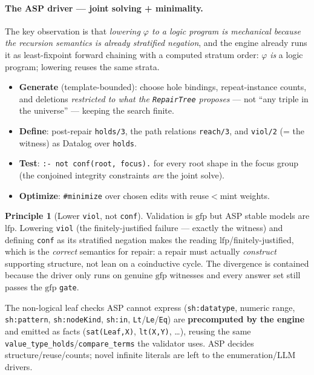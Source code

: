 \documentclass[11pt]{article}
\newcommand{\lfp}{\mathrm{lfp}}
\newcommand{\gfp}{\mathrm{gfp}}
\newcommand{\code}[1]{\texttt{#1}}
\theoremstyle{definition}
\newtheorem{principle}{Principle}[section]
\begin{document}
\paragraph{The ASP driver --- joint solving + minimality.} The key observation is
that \emph{lowering $\varphi$ to a logic program is mechanical because the
recursion semantics is already stratified negation}, and the engine already runs
it as least-fixpoint forward chaining with a computed stratum order: $\varphi$
\emph{is} a logic program; lowering reuses the same strata.
\begin{itemize}[leftmargin=1.4em]
  \item \textbf{Generate} (template-bounded): choose hole bindings, repeat-instance
  counts, and deletions \emph{restricted to what the \code{RepairTree} proposes}
  --- not ``any triple in the universe'' --- keeping the search finite.
  \item \textbf{Define}: post-repair \code{holds/3}, the path relations
  \code{reach/3}, and \code{viol/2} (= the witness) as Datalog over \code{holds}.
  \item \textbf{Test}: \code{:- not conf(root, focus).} for every root shape in the
  focus group (the conjoined integrity constraints \emph{are} the joint solve).
  \item \textbf{Optimize}: \code{\#minimize} over chosen edits with reuse$<$mint
  weights.
\end{itemize}
\begin{principle}[Lower \code{viol}, not \code{conf}]
Validation is $\gfp$ but ASP stable models are $\lfp$. Lowering \code{viol} (the
finitely-justified failure --- exactly the witness) and defining \code{conf} as
its stratified negation makes the reading $\lfp$/finitely-justified, which is the
\emph{correct} semantics for repair: a repair must actually \emph{construct}
supporting structure, not lean on a coinductive cycle. The divergence is contained
because the driver only runs on genuine $\gfp$ witnesses and every answer set
still passes the $\gfp$ \code{gate}.
\end{principle}
The non-logical leaf checks ASP cannot express (\code{sh:datatype}, numeric range,
\code{sh:pattern}, \code{sh:nodeKind}, \code{sh:in}, \code{Lt}/\code{Le}/\code{Eq})
are \textbf{precomputed by the engine} and emitted as facts (\code{sat(Leaf,X)},
\code{lt(X,Y)}, \dots), reusing the same \code{value\_type\_holds}/\code{compare\_terms}
the validator uses. ASP decides structure/reuse/counts; novel infinite literals
are left to the enumeration/LLM drivers.
\end{document}
